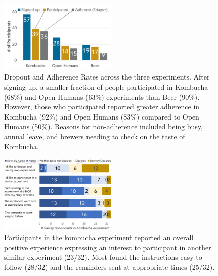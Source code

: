 \begin{figure}[h] 
\centering
  \includegraphics[width=0.5\textwidth]{figures/galileo/galileo-study3-1}
  \caption[Dropout and Adherence Rates across the three experiments]
{Dropout and Adherence Rates across the three experiments. After signing up, a smaller fraction of people participated in Kombucha (68\%) and Open Humans (63\%) experiments than Beer (90\%). However, those who participated reported greater adherence in Kombucha (92\%) and Open Humans (83\%) compared to Open Humans (50\%). Reasons for non-adherence included being busy, annual leave, and brewers needing to check on the taste of Kombucha. }
  \label{fig:galileo-result3-1}
\end{figure}

\begin{figure}[h] 
\centering
  \includegraphics[width=0.5\textwidth]{figures/galileo/galileo-study3-2}
  \caption[Participants in the kombucha experiment reported an overall positive experience]
{Participants in the kombucha experiment reported an overall positive experience expressing an interest to participant in another similar experiment (23/32). Most found the instructions easy to follow (28/32) and the reminders sent at appropriate times (25/32). }
  \label{fig:galileo-result3-2}
\end{figure}


